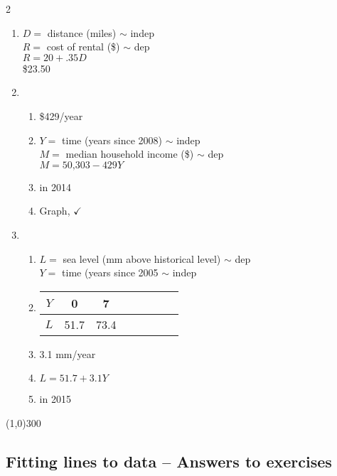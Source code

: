 \begin{multicols} {2}
\begin{enumerate}
\item %
 $D=$ distance (miles) $\sim$ indep \\ $R=$ cost of rental (\$) $\sim$ dep \\ $R=20 + .35D$ \\ \$23.50

\item %
\begin{enumerate}
\item \$429/year
\item $Y=$ time (years since 2008) $\sim$ indep \\ $M=$ median household income (\$) $\sim$ dep \\ $M = \text{50,303}-429Y$
\item in 2014
\item Graph, $\checkmark$
\end{enumerate}

\item %
\begin{enumerate}
\item $L=$ sea level (mm above historical level) $\sim$ dep \\ $Y=$ time (years since 2005 $\sim$ indep 
\item \begin{tabular} {|c| |c|c |c|c |c|c |c|}\hline
$Y$ & 0 & 7\\ \hline
$L$ & 51.7 & 73.4  \\ \hline
\end{tabular}
\item 3.1 mm/year 
\item $L=51.7+3.1Y$
\item in 2015
\end{enumerate}

\end{enumerate}
\end{multicols}

\begin{center}
\line(1,0){300} %
\end{center}

\subsection {Fitting lines to data -- Answers to exercises} %

